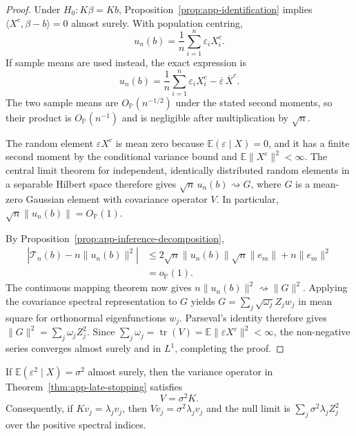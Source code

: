 \begin{proof}
Under $H_0:K\beta=Kb$, Proposition~\ref{prop:app-identification} implies
$\langle X^c,\beta-b\rangle=0$ almost surely.  With population centring,
\[
 u_n(b)=\frac1n\sum_{i=1}^n\varepsilon_iX_i^c.
\]
If sample means are used instead, the exact expression is
\[
 u_n(b)=\frac1n\sum_{i=1}^n\varepsilon_iX_i^c
        -\overline\varepsilon\,\overline X^c.
\]
The two sample means are $O_{\mathbb P}(n^{-1/2})$ under the stated second
moments, so their product is $O_{\mathbb P}(n^{-1})$ and is negligible after
multiplication by $\sqrt n$.

The random element $\varepsilon X^c$ is mean zero because
$\mathbb E(\varepsilon\mid X)=0$, and it has a finite second moment by
the conditional variance bound and $\mathbb E\|X^c\|^2<\infty$.  The central
limit theorem for independent, identically
distributed random elements in a separable Hilbert space therefore gives
$\sqrt n\,u_n(b)\rightsquigarrow G$, where $G$ is a mean-zero Gaussian
element with covariance operator $V$.  In particular,
$\sqrt n\|u_n(b)\|=O_{\mathbb P}(1)$.

By Proposition~\ref{prop:app-inference-decomposition},
\begin{align*}
 \left|\mathcal T_n(b)-n\|u_n(b)\|^2\right|
 &\leq 2\sqrt n\|u_n(b)\|\sqrt n\|e_m\|
       +n\|e_m\|^2 \\
 &=o_{\mathbb P}(1).
\end{align*}
The continuous mapping theorem now gives
$n\|u_n(b)\|^2\rightsquigarrow\|G\|^2$.  Applying the covariance spectral
representation to $G$ yields
$G=\sum_j\sqrt{\omega_j}Z_jw_j$ in mean square for orthonormal eigenfunctions
$w_j$.  Parseval's identity therefore gives
$\|G\|^2=\sum_j\omega_jZ_j^2$.  Since
$\sum_j\omega_j=\operatorname{tr}(V)
=\mathbb E\|\varepsilon X^c\|^2<\infty$, the non-negative series converges
almost surely and in $L^1$, completing the proof.
\end{proof}

\begin{proposition}
\label{prop:app-homoskedastic-variance}
If $\mathbb E(\varepsilon^2\mid X)=\sigma^2$ almost surely, then the variance
operator in Theorem~\ref{thm:app-late-stopping} satisfies
\[
    V=\sigma^2K.
\]
Consequently, if $Kv_j=\lambda_jv_j$, then
$Vv_j=\sigma^2\lambda_jv_j$ and the null limit is
$\sum_j\sigma^2\lambda_jZ_j^2$ over the positive spectral indices.
\end{proposition}

